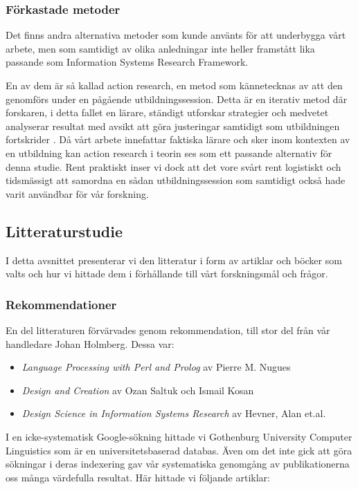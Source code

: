 \documentclass[swedish]{maucsthesis}
\begin{document}
\subsubsection{Förkastade metoder}
Det finns andra alternativa metoder som kunde använts för att underbygga vårt
arbete, men som samtidigt av olika anledningar inte heller framstått lika
passande som Information Systems Research Framework.

En av dem är så kallad action research, en metod som kännetecknas av att den
genomförs under en pågående utbildningssession. Detta är en iterativ metod där
forskaren, i detta fallet en lärare, ständigt utforskar strategier och medvetet
analyserar resultat med avsikt att göra justeringar samtidigt som utbildningen
fortskrider \cite{clement:2004}. Då vårt arbete innefattar faktiska lärare och
sker inom kontexten av en utbildning kan action research i teorin ses som ett
passande alternativ för denna studie. Rent praktiskt inser vi dock att det vore
svårt rent logistiskt och tidsmässigt att samordna en sådan utbildningssession
som samtidigt också hade varit användbar för vår forskning.

\subsection{Litteraturstudie}\label{litteraturstudie}

I detta avsnittet presenterar vi den litteratur i form av artiklar och böcker
som valts och hur vi hittade dem i förhållande till vårt forskningsmål och
frågor.

\subsubsection{Rekommendationer}

En del litteraturen förvärvades genom rekommendation, till stor del från vår
handledare Johan Holmberg. Dessa var:
\begin{itemize}
\item \textit{Language Processing with Perl and Prolog} av Pierre M. Nugues
\item \textit{Design and Creation} av Ozan Saltuk och Ismail Kosan
\item \textit{Design Science in Information Systems Research} av Hevner, Alan et.al.
\end{itemize}

I en icke-systematisk Google-sökning hittade vi Gothenburg University Computer
Linguistics som är en universitetsbaserad databas. Även om det inte gick att
göra sökningar i deras indexering gav vår systematiska genomgång av
publikationerna oss många värdefulla resultat. Här hittade vi följande artiklar:
\end{document}
